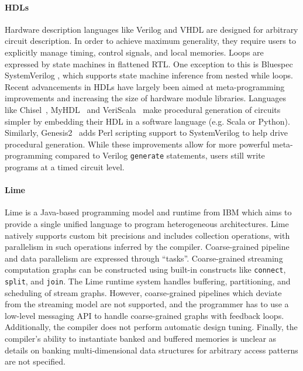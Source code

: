 \paragraph{HDLs}
Hardware description languages like Verilog and VHDL are designed for arbitrary circuit description. In order to achieve maximum generality, they require users to explicitly manage timing, control signals, and local memories. Loops are expressed by state machines in flattened RTL.
One exception to this is Bluespec SystemVerilog \cite{bluespec}, which supports state machine inference from nested while loops.
Recent advancements in HDLs have largely been aimed at meta-programming improvements and increasing the size of hardware module libraries.
Languages like Chisel~\cite{chisel}, MyHDL~\cite{myhdl} and VeriScala~\cite{veriscala} make procedural generation of circuits simpler by embedding their HDL in a software language (e.g. Scala or Python). Similarly, Genesis2~\cite{genesis2} adds Perl scripting support to SystemVerilog to help drive procedural generation. While these improvements allow for more powerful meta-programming compared to Verilog \texttt{\small{generate}} statements, users still write programs at a timed circuit level.


\paragraph{Lime}
Lime is a Java-based programming model and runtime from IBM which aims to provide a single unified language to program heterogeneous architectures. Lime natively supports custom bit precisions and includes collection operations, with parallelism in such operations inferred by the compiler. Coarse-grained pipeline and data parallelism are expressed through ``tasks''. Coarse-grained streaming computation graphs can be constructed using built-in constructs like \texttt{\small{connect}}, \texttt{\small{split}}, and \texttt{\small{join}}. The Lime runtime system handles buffering, partitioning, and scheduling of stream graphs. However, coarse-grained pipelines which deviate from the streaming model are not supported, and the programmer has to use a low-level messaging API to handle coarse-grained graphs with feedback loops. Additionally, the compiler does not perform automatic design tuning. Finally, the compiler's ability to instantiate banked and buffered memories is unclear as details on banking multi-dimensional data structures for arbitrary access patterns are not specified.


